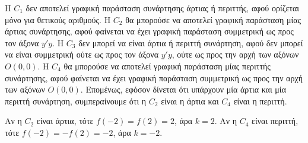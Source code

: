 \begin{alist}
\item Η $C_1$ δεν αποτελεί γραφική παράσταση συνάρτησης άρτιας ή περιττής, αφού ορίζεται μόνο για θετικούς αριθμούς.
Η $C_2$ θα μπορούσε να αποτελεί γραφική παράσταση μίας άρτιας συνάρτησης, αφού φαίνεται να έχει γραφική παράσταση συμμετρική ως προς τον άξονα $y'y$.
Η $C_3$ δεν μπορεί να είναι άρτια ή περιττή συνάρτηση, αφού δεν μπορεί να είναι συμμετρική ούτε ως προς τον άξονα $y'y$, ούτε ως προς την αρχή των αξόνων $O(0,0)$.
Η $C_4$ θα μπορούσε να αποτελεί γραφική παράσταση μίας περιττής συνάρτησης, αφού φαίνεται να έχει γραφική παράσταση συμμετρική ως προς την αρχή των αξόνων $O(0,0)$.
Επομένως, εφόσον δίνεται ότι υπάρχουν μία άρτια και μία περιττή συνάρτηση, συμπεραίνουμε ότι η $C_2$ είναι η άρτια και $C_4$ είναι η περιττή.
\item Αν η $C_2$ είναι άρτια, τότε $f(-2) = f(2) = 2$, άρα $k = 2$.
Αν η $C_4$ είναι περιττή, τότε $f(-2) = -f(2) = -2$, άρα $k = -2$.
\end{alist}

